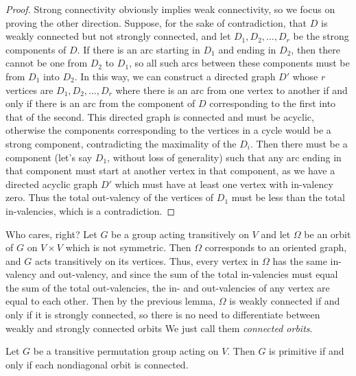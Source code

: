\begin{proof}
	Strong connectivity obviously implies weak connectivity, so we focus on proving the other direction.  Suppose, for the sake of contradiction, that $D$ is weakly connected but not strongly connected, and let $D_1,D_2,\dots, D_r$ be the strong components of $D$.  If there is an arc starting in $D_1$ and ending in $D_2$, then there cannot be one from $D_2$ to $D_1$, so all such arcs between these components must be from $D_1$ into $D_2$.  In this way, we can construct a directed graph $D'$ whose $r$ vertices are $D_1,D_2,\dots,D_r$ where there is an arc from one vertex to another if and only if there is an arc from the component of $D$ corresponding to the first into that of the second.  This directed graph is connected and must be acyclic, otherwise the components corresponding to the vertices in a cycle would be a strong component, contradicting the maximality of the $D_i$.  Then there must be a component (let's say $D_1$, without loss of generality) such that any arc ending in that component must start at another vertex in that component, as we have a directed acyclic graph $D'$ which must have at least one vertex with in-valency zero.  Thus the total out-valency of the vertices of $D_1$ must be less than the total in-valencies, which is a contradiction.
\end{proof}

Who cares, right?  Let $G$ be a group acting transitively on $V$ and let $\Omega$ be an orbit of $G$ on $V\times V$ which is not symmetric.  Then $\Omega$ corresponds to an oriented graph, and $G$ acts transitively on its vertices. Thus, every vertex in $\Omega$ has the same in-valency and out-valency, and since the sum of the total in-valencies must equal the sum of the total out-valencies, the in- and out-valencies of any vertex are equal to each other.  Then by the previous lemma, $\Omega$ is weakly connected if and only if it is strongly connected, so there is no need to differentiate between weakly and strongly connected orbits  We just call them \textit{connected orbits}.

\begin{lemma}
	
	Let $G$ be a transitive permutation group acting on $V$.  Then $G$ is primitive if and only if each nondiagonal orbit is connected.
\end{lemma}


